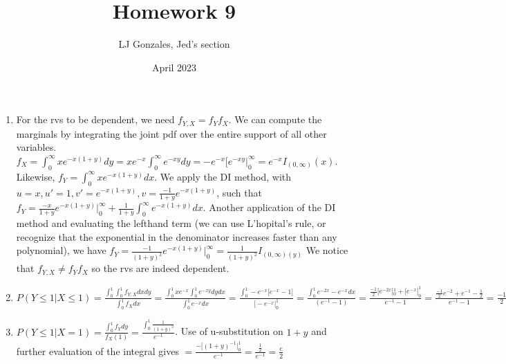 \documentclass{article}
\title{Homework 9}
\author{LJ Gonzales, Jed's section}
\date{April 2023}
\begin{document}
\maketitle

\begin{prob}
	\begin{enumerate}
	\item For the rvs to be dependent, we need $f_{Y,X}=f_Yf_X$. We can compute the marginals by integrating the joint pdf over the entire support of all other variables. $f_X=\int_{0}^{\infty}xe^{-x(1+y)}dy=xe^{-x}\int_{0}^{\infty}e^{-xy}dy=-e^{-x}\big[e^{-xy}\big|_{0}^{\infty}=e^{-x}I_{(0,\infty)}(x)$.
	Likewise, $f_Y=\int_{0}^{\infty}xe^{-x(1+y)}dx$. We apply the DI method, with $u=x, u'=1, v'=e^{-x(1+y)}, v=\frac{-1}{1+y}e^{-x(1+y)}$, such that $f_Y=\frac{-x}{1+y}e^{-x(1+y)}\big|^{\infty}_{0}+\frac{1}{1+y}\int^{\infty}_{0}e^{-x(1+y)}dx$.
	Another application of the DI method and evaluating the lefthand term (we can use L'hopital's rule, or recognize that the exponential in the denominator increases faster than any polynomial), we have $f_Y=\frac{-1}{(1+y)^2}e^{-x(1+y)}\big|^{\infty}_{0}=\frac{1}{(1+y)^2}I_{(0,\infty)(y)}$ 
	We notice that $f_{Y,X}\neq f_Yf_X$ so the rvs are indeed dependent.
\item $P(Y\leq1|X\leq1)=\frac{\int_{0}^{1}\int_{0}^{1}f_{Y,X}dxdy}{\int_{0}^{1}f_Xdx}=\frac{\int_{0}^{1}xe^{-x}\int_{0}^{1}e^{-xy}dydx}{\int_{0}^{1}e^{-x}dx}=\frac{\int_{0}^{1}-e^{-x}\big[e^{-x}-1\big]}{\big[-e^{-x}\big|^{1}_{0}}=\frac{\int^{1}_{0}e^{-2x}-e^{-x}dx}{(e^{-1}-1)}=\frac{\frac{-1}{2}[e^{-2x}|^{1}_{0}+[e^{-x}|^{1}_{0}}{e^{-1}-1}=\frac{\frac{-1}{2}e^{-2}+e^{-1}-\frac{1}{2}}{e^{-1}-1}=\frac{-1}{2}\frac{(e^{-1}-1)^2}{e^{-1}-1}=\frac{-1}{2}(e^{-1}-1)$

\item $P(Y\leq1|X=1)=\frac{\int_{0}^{1}f_Ydy}{f_X(1)}=\frac{\int_{0}^{1}\frac{1}{(1+y)^2}}{e^{-1}}$. Use of u-substitution on $1+y$ and further evaluation of the integral gives $=\frac{-[(1+y)^{-1}|^{1}_{0}}{e^{-1}}=\frac{\frac{1}{2}}{e^{-1}} =\frac{e}{2}$
	\end{enumerate}
\end{prob}
\end{document}
